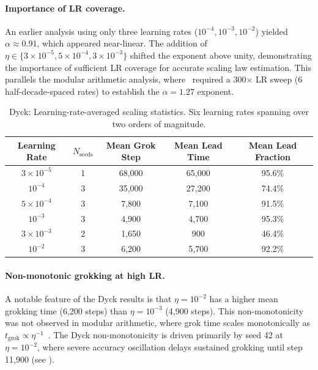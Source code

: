 \documentclass[11pt]{article}
\newcommand{\grokstep}{t_{\text{grok}}}
\begin{document}
\paragraph{Importance of LR coverage.} An earlier analysis using only three learning rates ($10^{-4}, 10^{-3}, 10^{-2}$) yielded $\alpha \approx 0.91$, which appeared near-linear. The addition of $\eta \in \{3{\times}10^{-5}, 5{\times}10^{-4}, 3{\times}10^{-3}\}$ shifted the exponent above unity, demonstrating the importance of sufficient LR coverage for accurate scaling law estimation. This parallels the modular arithmetic analysis, where~\citet{xu2026integrability} required a 300$\times$ LR sweep (6 half-decade-spaced rates) to establish the $\alpha = 1.27$ exponent.

\begin{table}[t]
  \centering
  \caption{Dyck: Learning-rate-averaged scaling statistics. Six learning rates spanning over two orders of magnitude.}
  \label{tab:dyck_lr_means}
  \small
  \begin{tabular}{@{}ccccc@{}}
    \toprule
    Learning Rate & $N_{\text{seeds}}$ & Mean Grok Step & Mean Lead Time & Mean Lead Fraction \\
    \midrule
    $3{\times}10^{-5}$ & 1 & 68,000 & 65,000 & 95.6\% \\
    $10^{-4}$ & 3 & 35,000 & 27,200 & 74.4\% \\
    $5{\times}10^{-4}$ & 3 & 7,800 & 7,100 & 91.5\% \\
    $10^{-3}$ & 3 & 4,900 & 4,700 & 95.3\% \\
    $3{\times}10^{-3}$ & 2 & 1,650 & 900 & 46.4\% \\
    $10^{-2}$ & 3 & 6,200 & 5,700 & 92.2\% \\
    \bottomrule
  \end{tabular}
\end{table}

\paragraph{Non-monotonic grokking at high LR.}
A notable feature of the Dyck results is that $\eta = 10^{-2}$ has a higher mean grokking time (6,200 steps) than $\eta = 10^{-3}$ (4,900 steps). This non-monotonicity was not observed in modular arithmetic, where grok time scales monotonically as $\grokstep \propto \eta^{-1}$~\citep{xu2026integrability}. The Dyck non-monotonicity is driven primarily by seed 42 at $\eta = 10^{-2}$, where severe accuracy oscillation delays sustained grokking until step 11,900 (see ).
\end{document}
